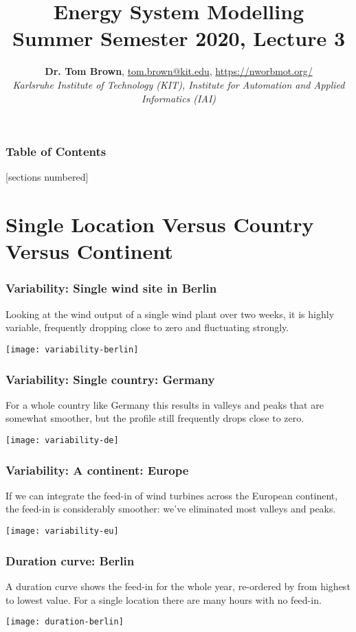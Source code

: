 \documentclass[10pt,aspectratio=169,dvipsnames]{beamer}
\title{Energy System Modelling\\ Summer Semester 2020, Lecture 3}
\author{
  {\bf Dr. Tom Brown}, \href{mailto:tom.brown@kit.edu}{tom.brown@kit.edu}, \url{https://nworbmot.org/}\\
  \emph{Karlsruhe Institute of Technology (KIT), Institute for Automation and Applied Informatics (IAI)}
}
\date{}
\begin{document}
\maketitle


\begin{frame}

  \frametitle{Table of Contents}
  [sections numbered]
  \tableofcontents[hideallsubsections]
\end{frame}


\section{Single Location Versus Country Versus Continent}




\begin{frame}
  \frametitle{Variability: Single wind site in Berlin}

  Looking at the wind output of a single wind plant over two weeks, it is highly
  variable, frequently dropping close to zero and fluctuating strongly.

  \centering
  \texttt{[image: variability-berlin]}


\end{frame}



\begin{frame}
  \frametitle{Variability: Single country: Germany}

  For a whole country like Germany this results in valleys and peaks that are  somewhat smoother, but the profile still frequently
  drops close to zero.

  \centering
  \texttt{[image: variability-de]}


\end{frame}



\begin{frame}
  \frametitle{Variability: A continent: Europe}


  If we can integrate the feed-in of wind turbines across the European continent, the
  feed-in is considerably smoother: we've eliminated most valleys and
  peaks.

  \centering
  \texttt{[image: variability-eu]}


\end{frame}


\begin{frame}
  \frametitle{Duration curve: Berlin}

  A \alert{duration curve} shows the feed-in for the whole year, re-ordered by from highest to lowest value. For a single location there are many hours with no feed-in.

  \centering
  \texttt{[image: duration-berlin]}


\end{frame}
\end{document}
